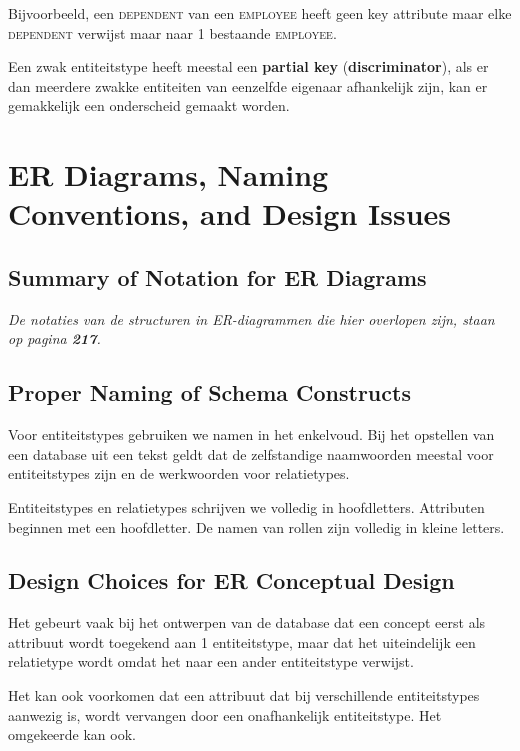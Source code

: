 Bijvoorbeeld, een \textsc{dependent} van een \textsc{employee} heeft geen key attribute maar elke \textsc{dependent} verwijst maar naar 1 bestaande \textsc{employee}.

Een zwak entiteitstype heeft meestal een \textbf{partial key} (\textbf{discriminator}), als er dan meerdere zwakke entiteiten van eenzelfde eigenaar afhankelijk zijn, kan er gemakkelijk een onderscheid gemaakt worden.


\setcounter{section}{6}


\section{ER Diagrams, Naming Conventions, and Design Issues}
\subsection{Summary of Notation for ER Diagrams}
\textit{De notaties van de structuren in ER-diagrammen die hier overlopen zijn, staan op pagina \textbf{217}.}

\subsection{Proper Naming of Schema Constructs}
Voor entiteitstypes gebruiken we namen in het enkelvoud. Bij het opstellen van een database uit een tekst geldt dat de zelfstandige naamwoorden meestal voor entiteitstypes zijn en de werkwoorden voor relatietypes.

Entiteitstypes en relatietypes schrijven we volledig in hoofdletters. Attributen beginnen met een hoofdletter. De namen van rollen zijn volledig in kleine letters.

\subsection{Design Choices for ER Conceptual Design}
Het gebeurt vaak bij het ontwerpen van de database dat een concept eerst als attribuut wordt toegekend aan 1 entiteitstype, maar dat het uiteindelijk een relatietype wordt omdat het naar een ander entiteitstype verwijst.

Het kan ook voorkomen dat een attribuut dat bij verschillende entiteitstypes aanwezig is, wordt vervangen door een onafhankelijk entiteitstype. Het omgekeerde kan ook.

